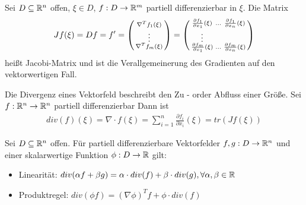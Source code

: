 \begin{definition}
	Sei $D \subseteq \mathbb{R}^n$ offen, $\xi \in D$, $f : D \rightarrow \mathbb{R}^m$ partiell differenzierbar in $\xi$. Die Matrix
	\begin{align*}
		Jf(\xi) = Df = f'= \left(\begin{smallmatrix}
			\nabla^T f_1(\xi) \\
			\vdots \\
			\nabla^T f_m(\xi) \\	
		\end{smallmatrix}\right) = 
		\left(\begin{smallmatrix}
			\frac{\partial f_1}{\partial x_1}(\xi) & \hdots & \frac{\partial f_1}{\partial x_n}(\xi)
			 \\
			 \vdots & & 
			 \\
			\frac{\partial f_m}{\partial x_1}(\xi) & \hdots & \frac{\partial f_m}{\partial x_n}(\xi)	
		\end{smallmatrix}\right) 
	\end{align*}
	heißt Jacobi-Matrix und ist die Verallgemeinerung des Gradienten auf den vektorwertigen Fall.
\end{definition}

\begin{definition}[Divergenz]
	Die Divergenz eines Vektorfeld beschreibt den Zu - order Abfluss einer Größe. Sei $f : \mathbb{R}^n \rightarrow \mathbb{R}^n$ partiell differenzierbar Dann ist
	\begin{align*}
	div(f)(\xi) = \nabla \cdot f(\xi) = \sum_{i = 1}^{n} \frac{\partial f_i}{\partial x_i}(\xi) = tr(Jf(\xi))
	\end{align*}
\end{definition}

\begin{satz}
	Sei $D \subseteq \mathbb{R}^n$ offen. Für partiell differenzierbare Vektorfelder $f,g : D \rightarrow \mathbb{R}^n$ und einer skalarwertige Funktion $\phi : D \rightarrow \mathbb{R}$ gilt:
	\begin{itemize}[noitemsep]
		\item Linearität: $div(\alpha f + \beta g) = \alpha \cdot div (f) + \beta \cdot div (g), \forall \alpha, \beta \in \mathbb{R}$
		\item  Produktregel: $div(\phi f) = (\nabla \phi)^T f + \phi \cdot div (f)$
	\end{itemize}
\end{satz}


